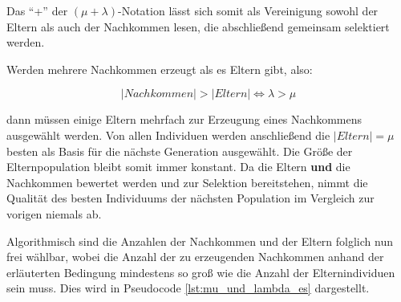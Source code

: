 Das \enquote{+} der $(\mu + \lambda)$-Notation lässt sich somit als Vereinigung sowohl der Eltern als auch der Nachkommen lesen, die abschließend gemeinsam selektiert werden.

Werden mehrere Nachkommen erzeugt als es Eltern gibt, also:

\begin{equation}
|Nachkommen| > |Eltern| \Leftrightarrow \lambda > \mu
\end{equation}

dann müssen einige Eltern mehrfach zur Erzeugung eines Nachkommens ausgewählt werden.
Von allen Individuen werden anschließend die $|Eltern| = \mu$ besten als Basis für die nächste Generation ausgewählt. Die Größe der Elternpopulation bleibt somit immer konstant. Da die Eltern \textbf{und} die Nachkommen bewertet werden und zur Selektion bereitstehen, nimmt die Qualität des besten Individuums der nächsten Population im Vergleich zur vorigen niemals ab.

Algorithmisch sind die Anzahlen der Nachkommen und der Eltern folglich nun frei wählbar, wobei die Anzahl der zu erzeugenden Nachkommen anhand der erläuterten Bedingung mindestens so groß wie die Anzahl der Elternindividuen sein muss. Dies wird in Pseudocode \ref{lst:mu_und_lambda_es} dargestellt.

